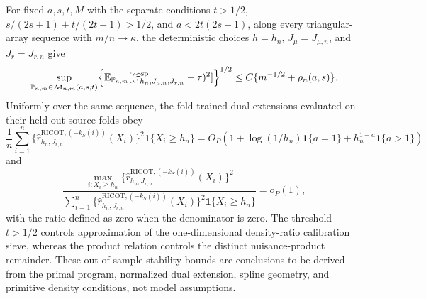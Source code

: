 For fixed \(a,s,t,M\) with the separate conditions \(t>1/2\), \(s/(2s+1)+t/(2t+1)>1/2\), and \(a<2t(2s+1)\), along every triangular-array sequence with \(m/n\to\kappa\), the deterministic choices \(h=h_n\), \(J_\mu=J_{\mu,n}\), and \(J_r=J_{r,n}\) give
\[
\sup_{\mathbb P_{n,m}\in\mathcal M_{n,m}(a,s,t)}\Bigl\{\mathbb E_{\mathbb P_{n,m}}[(\widehat\tau^{\mathrm{sp}}_{h_n,J_{\mu,n},J_{r,n}}-\tau)^2]\Bigr\}^{1/2}\le C\{m^{-1/2}+\rho_n(a,s)\}.
\]
Uniformly over the same sequence, the fold-trained dual extensions evaluated on their held-out source folds obey
\[
\frac1n\sum_{i=1}^n\{\widehat r^{\mathrm{RICOT},(-k_S(i))}_{h_n,J_{r,n}}(X_i)\}^2\mathbf 1\{X_i\ge h_n\}=O_P\!\left(1+\log(1/h_n)\mathbf 1\{a=1\}+h_n^{1-a}\mathbf 1\{a>1\}\right)
\]
and
\[
\frac{\max_{i:X_i\ge h_n}\{\widehat r^{\mathrm{RICOT},(-k_S(i))}_{h_n,J_{r,n}}(X_i)\}^2}{\sum_{i=1}^n\{\widehat r^{\mathrm{RICOT},(-k_S(i))}_{h_n,J_{r,n}}(X_i)\}^2\mathbf 1\{X_i\ge h_n\}}=o_P(1),
\]
with the ratio defined as zero when the denominator is zero. The threshold \(t>1/2\) controls approximation of the one-dimensional density-ratio calibration sieve, whereas the product relation controls the distinct nuisance-product remainder. These out-of-sample stability bounds are conclusions to be derived from the primal program, normalized dual extension, spline geometry, and primitive density conditions, not model assumptions.